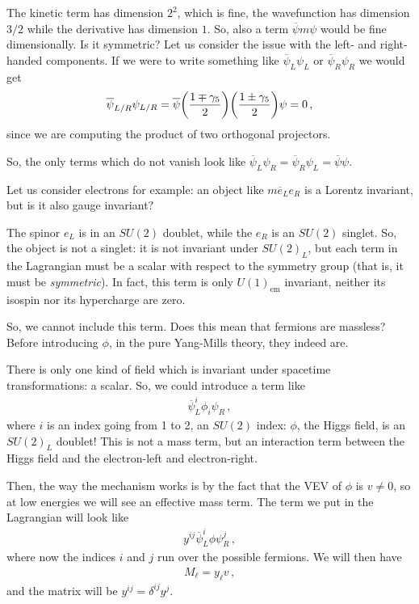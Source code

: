 \documentclass[main.tex]{subfiles}
\begin{document}
The kinetic term has dimension \(2^2\), which is fine, the wavefunction has dimension \(3/2\) while the derivative has dimension \(1\).
So, also a term \(\overline{\psi} m \psi \) would be fine dimensionally. Is it symmetric? 
Let us consider the issue with the left- and right-handed components. If we were to write something like \(\overline{\psi}_L \psi_L \) or \(\overline{\psi}_{R} \psi_{R}\) we would get 
%
\begin{align}
\overline{\psi}_{L/R} \psi_{L/R} = \overline{\psi} 
\qty(\frac{1 \mp \gamma_5 }{2}) 
\qty(\frac{1 \pm \gamma_5 }{2}) 
\psi 
= 0
\,,
\end{align}
%
since we are computing the product of two orthogonal projectors. 

So, the only terms which do not vanish look like \(\overline{\psi}_{L} \psi_{R} = \overline{\psi}_{R} \psi_{L} = \overline{\psi} \psi \).


Let us consider electrons for example: an object like \(m \overline{e}_{L} e_R\) is a Lorentz invariant, but is it also gauge invariant?

The spinor \(e_L\) is in an \(SU(2)\) doublet, while the \(e_R\) is an \(SU(2)\) singlet.
So, the object is not a singlet: it is not invariant under \(SU(2)_{L}\), but each term in the Lagrangian must be a scalar with respect to the symmetry group (that is, it must be \emph{symmetric}). 
In fact, this term is only \(U(1) _{\text{em}}\) invariant, neither its isospin nor its hypercharge are zero.

So, we cannot include this term.
Does this mean that fermions are massless?
Before introducing \(\phi \), in the pure Yang-Mills theory, they indeed are.

There is only one kind of field which is invariant under spacetime transformations: a scalar. So, we could introduce a term like 
%
\begin{align}
\overline{\psi}_{L}^{i} \phi_{i} \psi_{R}
\,,
\end{align}
%
where \(i\) is an index going from 1 to 2, an \(SU(2)\) index: \(\phi \), the Higgs field, is an \(SU(2)_L\) doublet!
This is not a mass term, but an interaction term between the Higgs field and the electron-left and electron-right.

Then, the way the mechanism works is by the fact that the VEV of \(\phi \) is \(v \neq 0\), so at low energies we will see an effective mass term.
The term we put in the Lagrangian will look like 
%
\begin{align}
y^{ij} \overline{\psi}^{i}_{L} \phi \psi_{R}^{j}
\,,
\end{align}
%
where now the indices \(i\) and \(j\) run over the possible fermions.
We will then have 
%
\begin{align}
M_\ell = y_{\ell} v 
\,,
\end{align}
%
and the matrix will be \(y^{ij} = \delta^{ij} y^{j}\).
\end{document}
